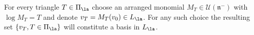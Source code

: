 \begin{theo}\label{main}
For every triangle $T\in \Pi_\la$ choose an arranged monomial $M_T\in\mathcal U(\mathfrak n^-)$ with $\log M_T=T$ and denote $v_T=M_T (v_0)\in L_\la$. For any such choice the resulting set $\{v_T, T\in\Pi_\la\}$ will constitute a basis in $L_\la$.
\end{theo}

